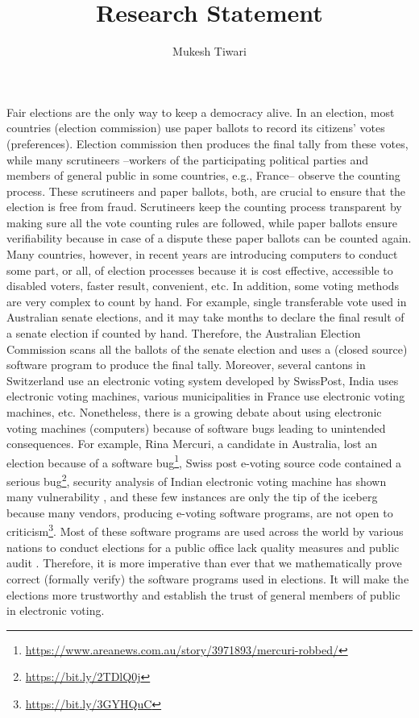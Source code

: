 \documentclass[a4paper]{article}
\title{Research Statement}
\author{Mukesh Tiwari}
\date{}
\begin{document}
\fontsize{12}{15}
\selectfont
\maketitle



Fair elections are the only way to keep a democracy alive. In an election, most countries (election commission) use paper ballots to record 
its citizens' votes (preferences). Election commission then produces the final tally from these votes, 
while many scrutineers --workers of the participating political parties and members of general 
public in some countries, e.g., France-- observe the counting process. 
These scrutineers and paper ballots, both, are crucial to ensure that 
the election is free from fraud. Scrutineers keep the counting process transparent by making sure all the vote counting 
rules are followed, while paper ballots ensure verifiability because in case of a dispute these paper ballots 
can be counted again. Many countries, however, in recent years are introducing computers to conduct some part, or all, of 
election processes because it is cost effective, accessible to disabled voters, faster result, convenient, etc. 
In addition, some voting methods are very complex to count by hand. For example,
single transferable vote used in Australian senate elections, and it may take months to declare the final result of 
a senate election if 
counted by hand. Therefore, the Australian Election Commission scans all the ballots of the senate election and 
uses a (closed source) software program to produce the final tally. Moreover, several cantons in Switzerland use an electronic 
voting system developed by SwissPost, India uses electronic voting machines, various municipalities in France 
use electronic voting machines, etc.  Nonetheless, there is a growing debate about using electronic voting machines (computers)
because of software bugs leading to unintended consequences. For example, Rina Mercuri, 
a candidate in Australia, lost an election because of 
a software bug\footnote{\url{https://www.areanews.com.au/story/3971893/mercuri-robbed/}}, 
Swiss post e-voting source code contained a serious 
bug\footnote{\url{https://bit.ly/2TDlQ0j}}, security analysis of Indian electronic 
voting machine has shown many vulnerability \cite{Wolchok:2010:SAI:1866307.1866309}, and 
these few instances are only the tip of the iceberg because many vendors, producing 
e-voting software programs, are not open to criticism\footnote{\url{https://bit.ly/3GYHQuC}}.
Most of 
these software programs are used across the world by various nations to conduct elections for a public office 
lack quality measures and public audit \cite{10.1145/3014812.3014837, 9152765, AEC:2013:LMM}. 
Therefore, it is more imperative than ever  that  we mathematically prove correct (formally verify)  the software programs 
used in elections. It will make the elections more trustworthy and establish the trust of general members of public
in electronic voting.
\end{document}
